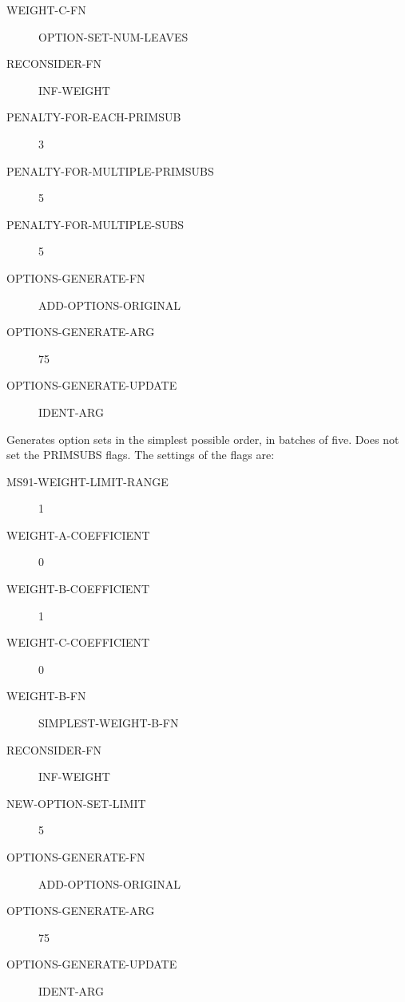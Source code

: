 \begin{description}
\begin{description}
\item[WEIGHT-C-FN] OPTION-SET-NUM-LEAVES

\item[RECONSIDER-FN] INF-WEIGHT

\item[PENALTY-FOR-EACH-PRIMSUB] 3

\item[PENALTY-FOR-MULTIPLE-PRIMSUBS] 5

\item[PENALTY-FOR-MULTIPLE-SUBS] 5

\item[OPTIONS-GENERATE-FN] ADD-OPTIONS-ORIGINAL

\item[OPTIONS-GENERATE-ARG] 75

\item[OPTIONS-GENERATE-UPDATE] IDENT-ARG

\end{description}

\item[MS91-SIMPLEST]  
Generates option sets in the simplest possible order, in 
batches of five. Does not set the PRIMSUBS flags. The settings of the flags are:
\begin{description}
\item[MS91-WEIGHT-LIMIT-RANGE] 1

\item[WEIGHT-A-COEFFICIENT] 0

\item[WEIGHT-B-COEFFICIENT] 1

\item[WEIGHT-C-COEFFICIENT] 0

\item[WEIGHT-B-FN] SIMPLEST-WEIGHT-B-FN

\item[RECONSIDER-FN] INF-WEIGHT

\item[NEW-OPTION-SET-LIMIT] 5

\item[OPTIONS-GENERATE-FN] ADD-OPTIONS-ORIGINAL

\item[OPTIONS-GENERATE-ARG] 75

\item[OPTIONS-GENERATE-UPDATE] IDENT-ARG

\end{description}

\item
\end{description}

